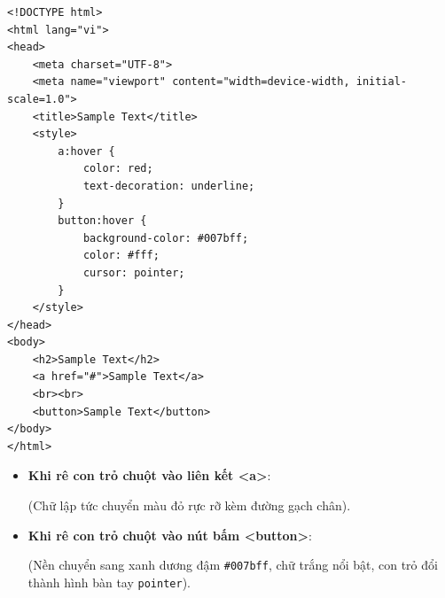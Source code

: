 \documentclass[11pt,oneside]{book}
\newcommand{\codeinline}[1]{\textcolor{accentOrange}{\texttt{#1}}}
\begin{document}
\begin{codeWindow}
\begin{lstlisting}[language=HTML5]
<!DOCTYPE html>
<html lang="vi">
<head>
    <meta charset="UTF-8">
    <meta name="viewport" content="width=device-width, initial-scale=1.0">
    <title>Sample Text</title>
    <style>
        a:hover {
            color: red;
            text-decoration: underline;
        }
        button:hover {
            background-color: #007bff;
            color: #fff;
            cursor: pointer;
        }
    </style>
</head>
<body>
    <h2>Sample Text</h2>
    <a href="#">Sample Text</a>
    <br><br>
    <button>Sample Text</button>
</body>
</html>
\end{lstlisting}
\end{codeWindow}

\begin{browserWindow}
\sffamily\small
\begin{itemize}[leftmargin=1.5em, itemsep=3pt, parsep=0pt]
    \item \textbf{Khi rê con trỏ chuột vào liên kết <a>}:
    \par\vspace{2pt}
    \quad (Chữ lập tức chuyển màu đỏ rực rỡ kèm đường gạch chân).
    \par\vspace{4pt}
    \item \textbf{Khi rê con trỏ chuột vào nút bấm <button>}:
    \par\vspace{2pt}
    \quad (Nền chuyển sang xanh dương đậm \codeinline{\#007bff}, chữ trắng nổi bật, con trỏ đổi thành hình bàn tay \codeinline{pointer}).
\end{itemize}
\end{browserWindow}
\end{document}
